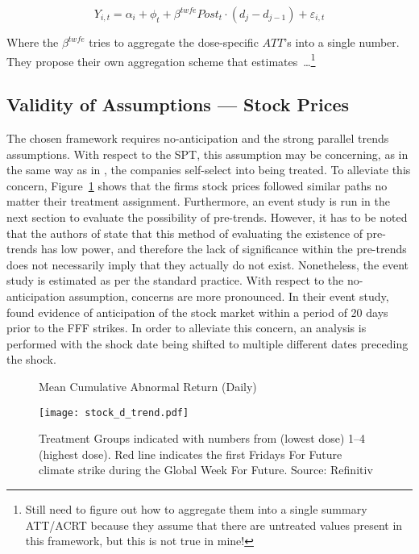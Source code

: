 \documentclass[12pt]{article}
\begin{document}
\begin{equation}
    Y_{i,t} = \alpha_i + \phi_t +  \beta^{twfe} Post_t \cdot (d_j - d_{j-1}) + \varepsilon_{i,t}
\end{equation}

Where the $\beta^{twfe}$ tries to aggregate the dose-specific $ATT$'s into a single number. They propose their own aggregation scheme that estimates\ \dots\footnote{Still need to figure out how to aggregate them into a single summary ATT/ACRT because they assume that there are untreated values present in this framework, but this is not true in mine!}

\subsection{Validity of Assumptions --- Stock Prices}

The chosen framework requires no-anticipation and the strong parallel trends assumptions. With respect to the SPT, this assumption may be concerning, as in the same way as in \textcite{koenigImpulsePurchasesGun2023}, the companies self-select into being treated. To alleviate this concern, Figure~\ref{fig:stock_trend} shows that the firms stock prices followed similar paths no matter their treatment assignment.
Furthermore, an event study is run in the next section to evaluate the possibility of pre-trends. However, it has to be noted that the authors of \textcite{callawayDifferenceindifferencesContinuousTreatment2024} state that this method of evaluating the existence of pre-trends has low power, and therefore the lack of significance within the pre-trends does not necessarily imply that they actually do not exist. Nonetheless, the event study is estimated as per the standard practice.
With respect to the no-anticipation assumption, concerns are more pronounced. In their event study, \textcite{schusterStockPriceReactions2023} found evidence of anticipation of the stock market within a period of 20 days prior to the FFF strikes. In order to alleviate this concern, an analysis is performed with the shock date being shifted to multiple different dates preceding the shock.

\begin{figure}[t]
    \caption{Mean Cumulative Abnormal Return (Daily)}\label{fig:stock_trend}
    \centering
    \texttt{[image: stock\_d\_trend.pdf]}
    \captionsetup{font=footnotesize}
    \caption*{Treatment Groups indicated with numbers from (lowest dose) 1--4 (highest dose). Red line indicates the first Fridays For Future climate strike during the Global Week For Future. Source: Refinitiv}
\end{figure}
\end{document}
